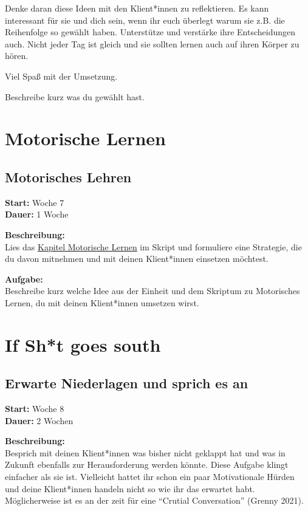 \documentclass[
  letterpaper,
  DIV=11,
  numbers=noendperiod]{scrreprt}
\begin{document}
Denke daran diese Ideen mit den Klient*innen zu reflektieren. Es kann
interessant für sie und dich sein, wenn ihr euch überlegt warum sie z.B.
die Reihenfolge so gewählt haben. Unterstütze und verstärke ihre
Entscheidungen auch. Nicht jeder Tag ist gleich und sie sollten lernen
auch auf ihren Körper zu hören.

Viel Spaß mit der Umsetzung.

Beschreibe kurz was du gewählt hast.

\section{Motorische Lernen}\label{motorische-lernen}

\subsection{Motorisches Lehren}\label{motorisches-lehren}

\textbf{Start:} Woche 7\\
\textbf{Dauer:} 1 Woche

\textbf{Beschreibung:}\\
Lies das
\href{https://bookdown.org/peter_raidl/personalcoaching_script/11-MotorLearning.html}{Kapitel
Motorische Lernen} im Skript und formuliere eine Strategie, die du davon
mitnehmen und mit deinen Klient*innen einsetzen möchtest.

\textbf{Aufgabe:}\\
Beschreibe kurz welche Idee aus der Einheit und dem Skriptum zu
Motorisches Lernen, du mit deinen Klient*innen umsetzen wirst.

\section{If Sh*t goes south}\label{if-sht-goes-south}

\subsection{Erwarte Niederlagen und sprich es
an}\label{erwarte-niederlagen-und-sprich-es-an}

\textbf{Start:} Woche 8\\
\textbf{Dauer:} 2 Wochen

\textbf{Beschreibung:}\\
Besprich mit deinen Klient*innen was bisher nicht geklappt hat und was
in Zukunft ebenfalls zur Herausforderung werden könnte. Diese Aufgabe
klingt einfacher als sie ist. Vielleicht hattet ihr schon ein paar
Motivationale Hürden und deine Klient*innen handeln nicht so wie ihr das
erwartet habt. Möglicherweise ist es an der zeit für eine ``Crutial
Conversation'' (Grenny 2021).
\end{document}
